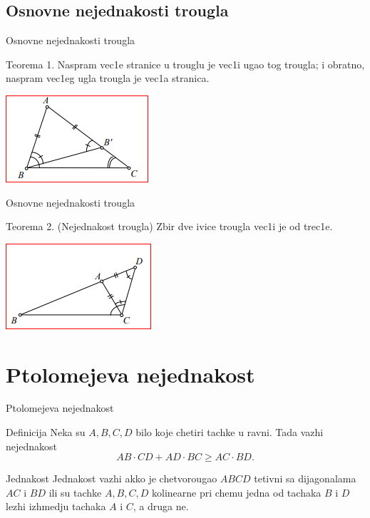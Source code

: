 \documentclass{beamer}
\begin{document}
\subsection{Osnovne nejednakosti trougla}
\begin{frame}{Osnovne nejednakosti trougla}
    \begin{block}{Teorema 1.}
    Naspram vec1e stranice u trouglu je vec1i ugao tog trougla; i obratno, naspram vec1eg ugla trougla je vec1a stranica.
    \end{block}
    \vspace{0.5cm}
\centering   \includegraphics[]{Slika1}
    
\end{frame}
\begin{frame}{Osnovne nejednakosti trougla}
   \begin{block}{Teorema 2.}
    (Nejednakost trougla) Zbir dve ivice trougla vec1i je od trec1e.
    \end{block}
    \vspace{0.5cm}
 \centering   \includegraphics[]{Slika2}
\end{frame}

\section{Ptolomejeva nejednakost}
\begin{frame}{Ptolomejeva nejednakost}
    \begin{block}{Definicija}
    Neka su $A,B,C,D$ bilo koje chetiri tachke u ravni. Tada vazhi nejednakost $$AB\cdot CD+AD\cdot BC \geq AC\cdot BD.$$
    \end{block}
    \begin{block}{Jednakost}
    Jednakost vazhi akko je chetvorougao $ABCD$ tetivni sa dijagonalama $AC$ i $BD$ ili su tachke $A,B,C,D$ kolinearne pri chemu jedna od tachaka $B$ i $D$ lezhi izhmedju tachaka $A$ i $C$, a druga ne.
    \end{block}
\end{frame}
\end{document}
